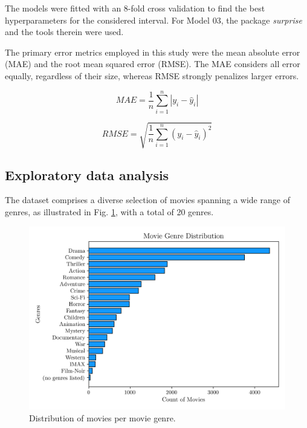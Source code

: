 \documentclass[conference]{IEEEtran}
\begin{document}
The models were fitted with an 8-fold cross validation to find the best hyperparameters for the considered interval. For Model 03, the package \textit{surprise} and the tools therein \cite{surprise} were used. 

The primary error metrics employed in this study were the mean absolute error (MAE) and the root mean squared error (RMSE). The MAE considers all error equally, regardless of their size, whereas RMSE strongly penalizes larger errors.

\begin{equation}
MAE = \frac{1}{n}\sum^n_{i=1}|y_i-\hat{y}_i|
\end{equation}

\begin{equation}
RMSE = \sqrt{\frac{1}{n}\sum^{n}_{i=1}(y_i - \hat{y}_i)^2}
\end{equation}

\subsection{Exploratory data analysis}

The dataset comprises a diverse selection of movies spanning a wide range of genres, as illustrated in Fig. \ref{fig:genre_distribution}, with a total of 20 genres.

\begin{figure}[H]
    \centering
    \includegraphics[width=1\linewidth]{assets/genre_distribution.png}
    \caption{Distribution of movies per movie genre.}
    \label{fig:genre_distribution}
\end{figure}
\end{document}
